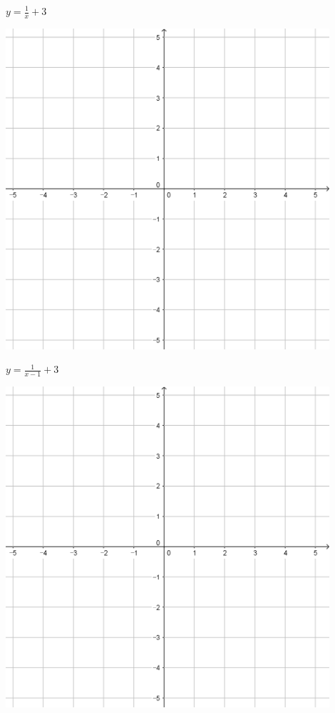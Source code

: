 \documentclass{oblivoir}
\begin{document}
\begin{minipage}{0.45\textwidth}\centering
\(y=\frac1x+3\)
\par\bigskip\includegraphics[width=0.9\textwidth]{55}
\end{minipage}
\begin{minipage}{0.45\textwidth}\centering
\(y=\frac1{x-1}+3\)
\par\bigskip\includegraphics[width=0.9\textwidth]{55}
\end{minipage}\bigskip\bigskip\par
\end{document}
